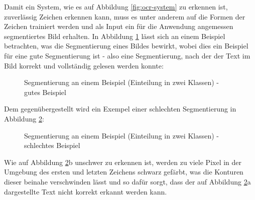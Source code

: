 		Damit ein System, wie es auf Abbildung \ref{fig:ocr-system} zu 
		erkennen ist, zuverlässig Zeichen erkennen kann, muss es unter 
		anderem auf die Formen der Zeichen trainiert werden und als Input ein für 
		die Anwendung angemessen segmentiertes Bild erhalten. In Abbildung \ref{fig:seg-example-good} lässt sich an einem Beispiel betrachten, was die Segmentierung eines Bildes bewirkt, wobei dies ein Beispiel für eine gute Segmentierung ist - also eine Segmentierung, nach der der Text im Bild korrekt und vollständig gelesen werden konnte:
		\begin{figure}[H]
			\centering
			\qquad
			\caption{Segmentierung an einem Beispiel (Einteilung in zwei Klassen) - gutes Beispiel}
			\label{fig:seg-example-good}
		\end{figure}
		Dem gegenübergestellt wird ein Exempel einer schlechten Segmentierung in Abbildung \ref{fig:seg-example-bad}:
		\begin{figure}[H]
			\centering
			\qquad
			\caption{Segmentierung an einem Beispiel (Einteilung in zwei Klassen) - schlechtes Beispiel}
			\label{fig:seg-example-bad}
		\end{figure}
		Wie auf Abbildung \ref{fig:seg-example-bad}b unschwer zu erkennen ist, werden zu viele Pixel in der Umgebung des ersten und letzten Zeichens schwarz gefärbt, was die Konturen dieser beinahe verschwinden lässt und so dafür sorgt, dass der auf Abbildung \ref{fig:seg-example-bad}a dargestellte Text nicht korrekt erkannt werden kann.\\
